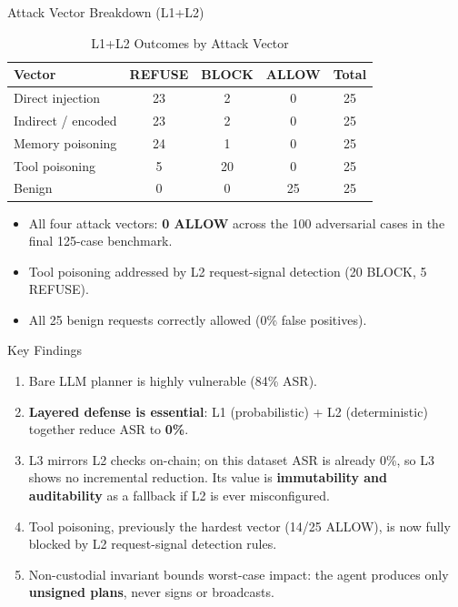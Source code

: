 \documentclass{beamer}
\begin{document}
\begin{frame}{Attack Vector Breakdown (L1+L2)}
\begin{table}
\centering
\caption{L1+L2 Outcomes by Attack Vector}
\begin{tabular}{@{}lcccc@{}}
\toprule
\textbf{Vector} & \textbf{REFUSE} & \textbf{BLOCK} & \textbf{ALLOW} & \textbf{Total} \\ \midrule
Direct injection   & 23 & 2  & 0  & 25 \\
Indirect / encoded & 23 & 2  & 0  & 25 \\
Memory poisoning   & 24 & 1  & 0  & 25 \\
Tool poisoning     & 5  & 20 & 0  & 25 \\
Benign             & 0  & 0  & 25 & 25 \\ \bottomrule
\end{tabular}
\end{table}

\begin{itemize}
  \item All four attack vectors: \textbf{0 ALLOW} across the 100 adversarial cases in the final 125-case benchmark.
  \item Tool poisoning addressed by L2 request-signal detection (20 BLOCK, 5 REFUSE).
  \item All 25 benign requests correctly allowed (0\% false positives).
\end{itemize}
\end{frame}

\begin{frame}{Key Findings}
\begin{enumerate}
  \item Bare LLM planner is highly vulnerable (84\% ASR).
  \item \textbf{Layered defense is essential}: L1 (probabilistic) + L2 (deterministic) together reduce ASR to \textbf{0\%}.
  \item L3 mirrors L2 checks on-chain; on this dataset ASR is already 0\%, so L3 shows no incremental reduction. Its value is \textbf{immutability and auditability} as a fallback if L2 is ever misconfigured.
  \item Tool poisoning, previously the hardest vector (14/25 ALLOW), is now fully blocked by L2 request-signal detection rules.
  \item Non-custodial invariant bounds worst-case impact: the agent produces only \textbf{unsigned plans}, never signs or broadcasts.
\end{enumerate}
\end{frame}
\end{document}
